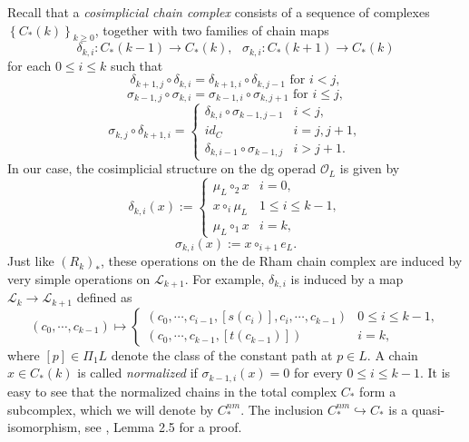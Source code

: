 \documentclass[a4paper]{article}
\numberwithin{equation}{section}
\begin{document}
Recall that a \textit{cosimplicial chain complex} consists of a sequence of complexes $\left\{C_\ast(k)\right\}_{k\geq0}$, together with two families of chain maps
\begin{equation}
\delta_{k,i}:C_\ast(k-1)\rightarrow C_\ast(k),\textrm{ }\sigma_{k,i}:C_\ast(k+1)\rightarrow C_\ast(k)
\end{equation}
for each $0\leq i\leq k$ such that
\begin{equation}\label{eq:cod}
\delta_{k+1,j}\circ\delta_{k,i}=\delta_{k+1,i}\circ\delta_{k,j-1}\textrm{ for }i<j,
\end{equation}
\begin{equation}\label{eq:cos}
\sigma_{k-1,j}\circ\sigma_{k,i}=\sigma_{k-1,i}\circ\sigma_{k,j+1}\textrm{ for }i\leq j,
\end{equation}
\begin{equation}\label{eq:sd}
\sigma_{k,j}\circ\delta_{k+1,i}=\left\{\begin{array}{ll}
\delta_{k,i}\circ\sigma_{k-1,j-1} & i<j, \\ \mathit{id}_C & i=j,j+1, \\ \delta_{k,i-1}\circ\sigma_{k-1,j} & i>j+1.
\end{array}\right.
\end{equation}
In our case, the cosimplicial structure on the dg operad $\mathcal{O}_L$ is given by
\begin{equation}\label{eq:cosimp}
\delta_{k,i}(x):=\left\{\begin{array}{ll}
\mu_L\circ_2x & i=0, \\ x\circ_i\mu_L & 1\leq i\leq k-1, \\ \mu_L\circ_1x & i=k,
\end{array}\right.
\end{equation}
\begin{equation}
\sigma_{k,i}(x):=x\circ_{i+1} e_L.
\end{equation}
Just like $(R_k)_\ast$, these operations on the de Rham chain complex are induced by very simple operations on $\mathcal{L}_{k+1}$. For example, $\delta_{k,i}$ is induced by a map $\mathcal{L}_k\rightarrow\mathcal{L}_{k+1}$ defined as
\begin{equation}
(c_0,\cdots,c_{k-1})\mapsto\left\{\begin{array}{ll}
\left(c_0,\cdots,c_{i-1},[s(c_i)],c_i,\cdots,c_{k-1}\right) & 0\leq i\leq k-1, \\
\left(c_0,\cdots,c_{k-1},[t(c_{k-1})]\right) & i=k,
\end{array}\right.
\end{equation}
where $[p]\in\Pi_1L$ denote the class of the constant path at $p\in L$. A chain $x\in C_\ast(k)$ is called \textit{normalized} if $\sigma_{k-1,i}(x)=0$ for every $0\leq i\leq k-1$. It is easy to see that the normalized chains in the total complex $C_\ast$ form a subcomplex, which we will denote by $C_\ast^\mathit{nm}$. The inclusion $C_\ast^\mathit{nm}\hookrightarrow C_\ast$ is a quasi-isomorphism, see \cite{ki1}, Lemma 2.5 for a proof.
\end{document}

